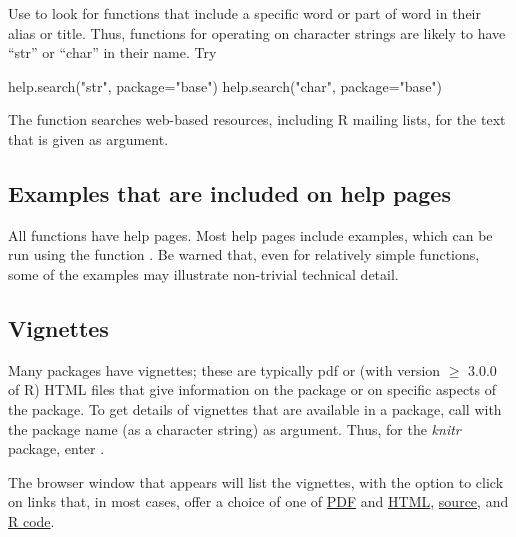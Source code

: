 Use  to look for functions that include a specific
word or part of word in their alias or title. Thus,
functions for operating on character strings are likely to have
``str'' or ``char'' in their name. Try
\begin{Schunk}
\begin{Sinput}
help.search("str", package="base")
help.search("char", package="base")
\end{Sinput}
\end{Schunk}

The function  searches web-based resources, including
R mailing lists, for the text that is given as argument.

\subsection*{Examples that are included on help pages}

All functions have help pages.  Most help pages include examples, which can be
run using the function .  Be warned that, even for
relatively simple functions, some of the examples may illustrate
non-trivial technical detail.

\subsection*{Vignettes}

  Many packages
have vignettes; these are typically pdf or (with version $\ge$ 3.0.0
of R) HTML files that give information on the package or on specific
aspects of the package. To get details of vignettes that are available
in a package, call  with the package name (as
a character string) as argument.  Thus, for the \textit{knitr}
package, enter .

The browser window that appears will list the vignettes, with the
option to click on links that, in most cases, offer a choice of
one of \underline{PDF} and \underline{HTML}, \underline{source},
and \underline{R code}.

